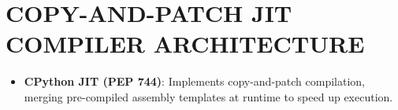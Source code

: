 \hypertarget{copy-and-patch-jit-compiler-architecture}{%
\chapter{COPY-AND-PATCH JIT COMPILER
ARCHITECTURE}\label{copy-and-patch-jit-compiler-architecture}}

\begin{itemize}
\tightlist
\item
  \textbf{CPython JIT (PEP 744)}: Implements copy-and-patch compilation,
  merging pre-compiled assembly templates at runtime to speed up
  execution.
\end{itemize}
